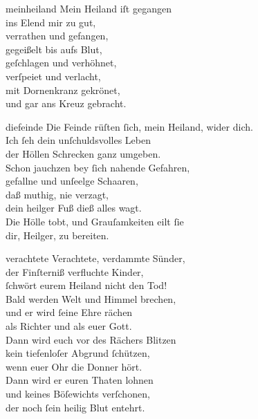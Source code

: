 \documentclass[tocstyle=ref-genre]{ees}
\begin{document}
{  \begin{movement}{meinheiland}
    \voice[Coro]
    Mein Heiland iſt gegangen\\
    ins Elend mir zu gut,\\
    verrathen und gefangen,\\
    gegeißelt bis aufs Blut,\\
    geſchlagen und verhöhnet,\\
    verſpeiet und verlacht,\\
    mit Dornenkranz gekrönet,\\
    und gar ans Kreuz gebracht.
  \end{movement}

  \begin{movement}{diefeinde}
    \voice[Basso]
    Die Feinde rüſten ſich, mein Heiland, wider dich.\\
    Ich ſeh dein unſchuldsvolles Leben\\
    der Höllen Schrecken ganz umgeben.\\
    Schon jauchzen bey ſich nahende Gefahren,\\
    gefallne und unſeelge Schaaren,\\
    daß muthig, nie verzagt,\\
    dein heilger Fuß dieß alles wagt.\\
    Die Hölle tobt, und Grauſamkeiten eilt ſie\\
    dir, Heilger, zu bereiten.
  \end{movement}

  \begin{movement}{verachtete}
    \voice[Basso]
    Verachtete, verdammte Sünder,\\
    der Finſterniß verfluchte Kinder,\\
    ſchwört eurem Heiland nicht den Tod!\\
    Bald werden Welt und Himmel brechen,\\
    und er wird ſeine Ehre rächen\\
    als Richter und als euer Gott.\\[1ex]
    Dann wird euch vor des Rächers Blitzen\\
    kein tiefenloſer Abgrund ſchützen,\\
    wenn euer Ohr die Donner hört.\\
    Dann wird er euren Thaten lohnen\\
    und keines Böſewichts verſchonen,\\
    der noch ſein heilig Blut entehrt.
  \end{movement}

}
\end{document}
